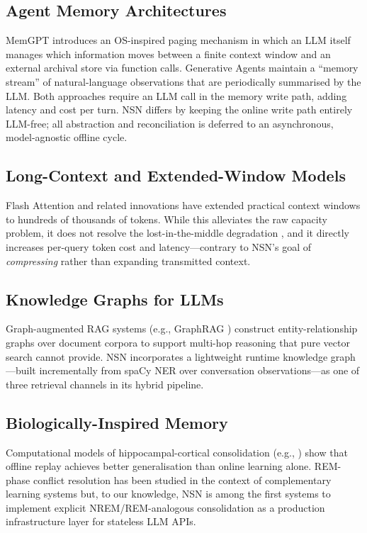 \documentclass[conference]{IEEEtran}
\begin{document}
\subsection{Agent Memory Architectures}
MemGPT \cite{packer2023memgpt} introduces an OS-inspired paging mechanism in
which an LLM itself manages which information moves between a finite context
window and an external archival store via function calls.  Generative Agents
\cite{park2023generative} maintain a ``memory stream'' of natural-language
observations that are periodically summarised by the LLM.  Both approaches
require an LLM call in the memory write path, adding latency and cost per
turn.  NSN differs by keeping the online write path entirely LLM-free;
all abstraction and reconciliation is deferred to an asynchronous,
model-agnostic offline cycle.

\subsection{Long-Context and Extended-Window Models}
Flash Attention \cite{dao2022flashattention} and related innovations have
extended practical context windows to hundreds of thousands of tokens.  While
this alleviates the raw capacity problem, it does not resolve the
lost-in-the-middle degradation \cite{liu2024lost}, and it directly increases
per-query token cost and latency---contrary to NSN's goal of \emph{compressing}
rather than expanding transmitted context.

\subsection{Knowledge Graphs for LLMs}
Graph-augmented RAG systems (e.g., GraphRAG \cite{edge2024graphrag}) construct
entity-relationship graphs over document corpora to support multi-hop reasoning
that pure vector search cannot provide.  NSN incorporates a lightweight
runtime knowledge graph---built incrementally from spaCy NER over conversation
observations---as one of three retrieval channels in its hybrid pipeline.

\subsection{Biologically-Inspired Memory}
Computational models of hippocampal-cortical consolidation (e.g.,
\cite{kumaran2016learning}) show that offline replay achieves better
generalisation than online learning alone.  REM-phase conflict resolution has
been studied in the context of complementary learning systems \cite{mcclelland1995}
but, to our knowledge, NSN is among the first systems to implement explicit
NREM/REM-analogous consolidation as a production infrastructure layer for
stateless LLM APIs.
\end{document}
